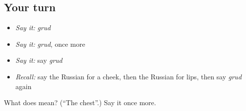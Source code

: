 \subsection*{Your turn}
\begin{itemize}
\raggedright
  \item \emph{Say it:} \emph{grud}
  \item \emph{Say it:} \emph{grud}, once more
  \item \emph{Say it:} say \emph{grud}
  \item \emph{Recall:} say the Russian for a cheek, then the Russian for lips, then say \emph{grud} again
\end{itemize}

\begin{tcolorbox}[breakable,colback=teal!4,colframe=teal!35!black,title={Before you move on}]
What does  mean? (\textquotedblleft{}The chest\textquotedblright{}.) Say it once more.
\end{tcolorbox}
